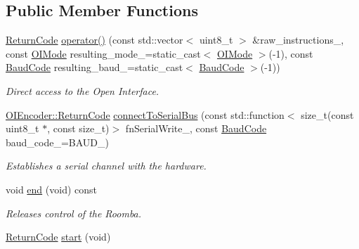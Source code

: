 \subsection*{Public Member Functions}
\begin{DoxyCompactItemize}
\item 
\hyperlink{classroomba_1_1series500_1_1oi_1_1_o_i_encoder_ac2c8ad2f0306050926f89882d74696cc}{Return\+Code} \hyperlink{classroomba_1_1series500_1_1oi_1_1_o_i_encoder_a20312fcf19260bf60956455a9a529f3a}{operator()} (const std\+::vector$<$ uint8\+\_\+t $>$ \&raw\+\_\+instructions\+\_\+, const \hyperlink{namespaceroomba_1_1series500_1_1oi_a8dde6b4ac23e862ae50868c3963d7063}{O\+I\+Mode} resulting\+\_\+mode\+\_\+=static\+\_\+cast$<$ \hyperlink{namespaceroomba_1_1series500_1_1oi_a8dde6b4ac23e862ae50868c3963d7063}{O\+I\+Mode} $>$(-\/1), const \hyperlink{namespaceroomba_1_1series500_1_1oi_ae5028fe52e1dabe309aff04a45581bfd}{Baud\+Code} resulting\+\_\+baud\+\_\+=static\+\_\+cast$<$ \hyperlink{namespaceroomba_1_1series500_1_1oi_ae5028fe52e1dabe309aff04a45581bfd}{Baud\+Code} $>$(-\/1))
\begin{DoxyCompactList}\small\item\em Direct access to the Open Interface. \end{DoxyCompactList}\item 
\hyperlink{classroomba_1_1series500_1_1oi_1_1_o_i_encoder_ac2c8ad2f0306050926f89882d74696cc}{O\+I\+Encoder\+::\+Return\+Code} \hyperlink{classroomba_1_1series500_1_1oi_1_1_o_i_encoder_a94c90ba60036d4647c1286107520f60a}{connect\+To\+Serial\+Bus} (const std\+::function$<$ size\+\_\+t(const uint8\+\_\+t $\ast$, const size\+\_\+t)$>$ fn\+Serial\+Write\+\_\+, const \hyperlink{namespaceroomba_1_1series500_1_1oi_ae5028fe52e1dabe309aff04a45581bfd}{Baud\+Code} baud\+\_\+code\+\_\+=B\+A\+U\+D\+\_)
\begin{DoxyCompactList}\small\item\em Establishes a serial channel with the hardware. \end{DoxyCompactList}\item 
void \hyperlink{classroomba_1_1series500_1_1oi_1_1_o_i_encoder_ac4b19dd3355212072fd27700e6d239ad}{end} (void) const 
\begin{DoxyCompactList}\small\item\em Releases control of the Roomba. \end{DoxyCompactList}\item 
\hyperlink{classroomba_1_1series500_1_1oi_1_1_o_i_encoder_ac2c8ad2f0306050926f89882d74696cc}{Return\+Code} \hyperlink{classroomba_1_1series500_1_1oi_1_1_o_i_encoder_a1601020b3fbf4e02e5cd2cf87fbf4432}{start} (void)

\end{DoxyCompactItemize}
